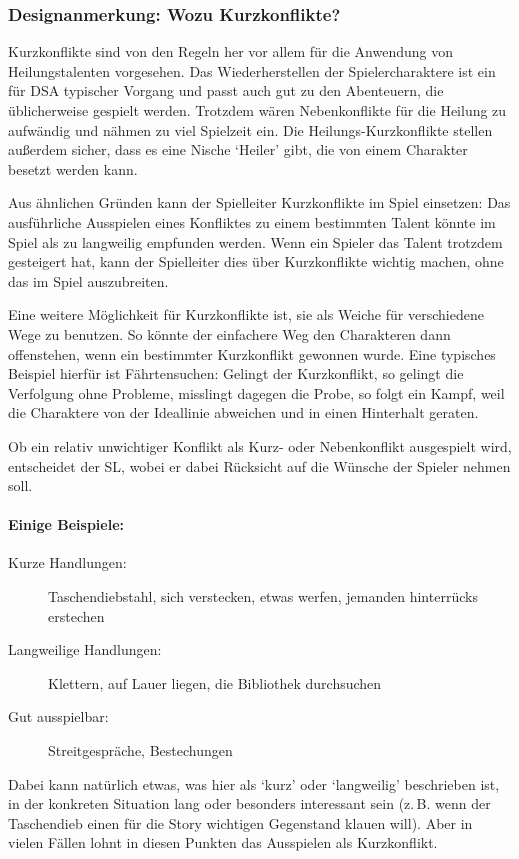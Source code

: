 \begin{design}
\subsubsection{Designanmerkung: Wozu Kurzkonflikte?}
Kurzkonflikte sind von den Regeln her vor allem für die Anwendung von Heilungstalenten vorgesehen. Das Wiederherstellen der Spielercharaktere ist ein für DSA typischer Vorgang und passt auch gut zu den Abenteuern, die üblicherweise gespielt werden. Trotzdem wären Nebenkonflikte für die Heilung zu aufwändig und nähmen zu viel Spielzeit ein. Die Heilungs-Kurzkonflikte stellen außerdem sicher, dass es eine Nische `Heiler' gibt, die von einem Charakter besetzt werden kann.

Aus ähnlichen Gründen kann der Spielleiter Kurzkonflikte im Spiel einsetzen: Das ausführliche Ausspielen eines Konfliktes zu einem bestimmten Talent könnte im Spiel als zu langweilig empfunden werden. Wenn ein Spieler das Talent trotzdem gesteigert hat, kann der Spielleiter dies über Kurzkonflikte wichtig machen, ohne das im Spiel auszubreiten.

Eine weitere Möglichkeit für Kurzkonflikte ist, sie als Weiche für verschiedene Wege zu benutzen. So könnte der einfachere Weg den Charakteren dann offenstehen, wenn ein bestimmter Kurzkonflikt gewonnen wurde. Eine typisches Beispiel hierfür ist Fährtensuchen: Gelingt der Kurzkonflikt, so gelingt die Verfolgung ohne Probleme, misslingt dagegen die Probe, so folgt ein Kampf, weil die Charaktere von der Ideallinie abweichen und in einen Hinterhalt geraten.
\end{design}

Ob ein relativ unwichtiger Konflikt als Kurz- oder Nebenkonflikt ausgespielt wird, entscheidet der SL, wobei er dabei Rücksicht auf die Wünsche der Spieler nehmen soll.

\begin{beispiel}
\paragraph{Einige Beispiele:}
\begin{description}
\item[Kurze Handlungen:] Taschendiebstahl, sich verstecken, etwas werfen, jemanden hinterrücks erstechen
\item[Langweilige Handlungen:] Klettern, auf Lauer liegen, die Bibliothek durchsuchen
\item[Gut ausspielbar:] Streitgespräche, Bestechungen
\end{description}
Dabei kann natürlich etwas, was hier als `kurz' oder `langweilig' beschrieben ist, in der konkreten Situation lang oder besonders interessant sein (z.\,B. wenn der Taschendieb einen für die Story wichtigen Gegenstand klauen will). Aber in vielen Fällen lohnt in diesen Punkten das Ausspielen als Kurzkonflikt.
\medskip
\end{beispiel}

